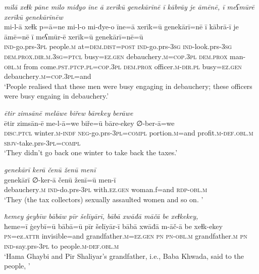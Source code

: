 \ea \label{BP.45}
\textit{milā xeɫk pāne milo miđyo īne ā xerīkū genekārīnē ī kābrāy je āmēnē, ī meʕmūrē xerīkū genekārīnēw} \\ 
\gll mi-l-ā xeɫk p=ā=ne mi-l-o mi-đye-o īne=ā xerīk=ū genekārī=nē ī kābrā-ī je āmē=nē ī meʕmūr-ē xerīk=ū genekārī=nē=ū \\ 
 \textsc{ind-}go.prs\textsc{-3pl} people\textsc{.m} at=\textsc{dem.dist}\textsc{=\textsc{post}} \textsc{ind-}go.prs\textsc{-3sg} \textsc{ind-}look.prs\textsc{-3sg} \textsc{dem.prox}\textsc{.dir}\textsc{.m}\textsc{.3sg}=\textsc{ptcl} busy\textsc{=ez.gen} debauchery\textsc{.m}\textsc{=cop}\textsc{.3pl} \textsc{dem.prox} man\textsc{-obl}\textsc{.m} from come\textsc{.pst}\textsc{.ptcp}\textsc{.pl}\textsc{=cop}\textsc{.3pl} \textsc{dem.prox} officer\textsc{.m}\textsc{-dir}\textsc{.pl} busy\textsc{=ez.gen} debauchery\textsc{.m}\textsc{=cop}\textsc{.3pl}=and \\ 
\glt `People realised that these men were busy engaging in debauchery; these officers were busy engaing in debauchery.'
\z 
 
\ea \label{BP.48}
\textit{ētir zimsānē melāwe biřew bārekey berāwe} \\ 
\gll ētir zimsān-ē me-l-ā=we biře=ū bāre-ekey ∅-ber-ā=we \\ 
 \textsc{disc.ptcl} winter\textsc{.m}\textsc{-indf} \textsc{neg-}go.prs\textsc{-3pl}\textsc{=compl} portion\textsc{.m}=and profit\textsc{.m}\textsc{-def}\textsc{.obl}\textsc{.m} \textsc{sbjv-}take.prs\textsc{-3pl}\textsc{=compl} \\ 
\glt `They didn’t go back one winter to take back the taxes.'
\z 
 
\ea \label{BP.49}
\textit{genekārī kerā čenū ženū menī} \\ 
\gll genekārī ∅-ker-ā čenū ženī=ū men-ī \\ 
 debauchery\textsc{.m} \textsc{ind-}do.prs\textsc{-3pl} with\textsc{.ez.gen} woman.f=and \textsc{rdp}\textsc{-obl}\textsc{.m} \\ 
\glt `They (the tax collectors) sexually assaulted women and so on. '
\z 
 
\ea \label{BP.51}
\textit{ħemey ġeybīw bābāw pīr šelīyārī, bābā xwāđā māčā be xeɫkekey,} \\ 
\gll ħeme=ī ġeybī=ū bābā=ū pīr šelīyār-ī bābā xwāđā m-āč-ā be xeɫk-ekey \\ 
 \textsc{pn}=ez.\textsc{attr} invisible=and grandfather\textsc{.m}\textsc{=ez.gen} \textsc{pn} \textsc{pn}\textsc{-obl}\textsc{.m} grandfather\textsc{.m} \textsc{pn} \textsc{ind-}say.prs\textsc{-3pl} to people\textsc{.m}\textsc{-def}\textsc{.obl}\textsc{.m} \\ 
\glt `Hama Ghaybi and Pir Shaliyar’s grandfather, i.e., Baba Khwada, said to the people, '
\z 
 
